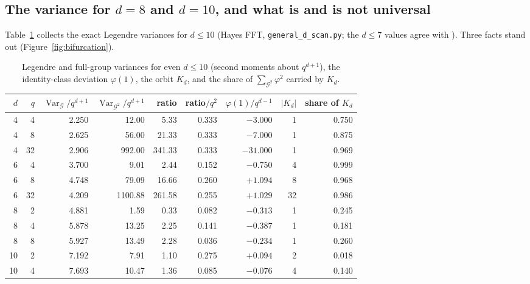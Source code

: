 \documentclass[11pt,a4paper]{amsart}
\theoremstyle{definition}
\newcommand{\G}{\mathcal{G}}
\newcommand{\Var}{\operatorname{Var}}
\begin{document}
\subsection{The variance for \texorpdfstring{$d=8$ and $d=10$}{d=8 and d=10}, and what is and is not universal}
Table~\ref{tab:generald} collects the exact Legendre variances for $d\le10$ (Hayes FFT, \texttt{general\_d\_scan.py}; the $d\le7$ values agree with \cite[Table~4]{Chen}). Three facts stand out (Figure~\ref{fig:bifurcation}).

\begin{table}[H]
\centering
\caption{Legendre and full-group variances for even $d\le10$ (second moments about $q^{d+1}$), the identity-class deviation $\varphi(1)$, the orbit $K_d$, and the share of $\sum_{\G^2}\varphi^2$ carried by $K_d$.}\label{tab:generald}
\small
\begin{tabular}{@{}rrrrrrrrr@{}}
\toprule
$d$ & $q$ & $\Var_\G/q^{d+1}$ & $\Var_{\G^2}/q^{d+1}$ & ratio & ratio$/q^2$ & $\varphi(1)/q^{d-1}$ & $|K_d|$ & share of $K_d$\\
\midrule
4 & 4 & 2.250 & 12.00 & 5.33 & 0.333 & $-3.000$ & 1 & 0.750\\
4 & 8 & 2.625 & 56.00 & 21.33 & 0.333 & $-7.000$ & 1 & 0.875\\
4 & 32 & 2.906 & 992.00 & 341.33 & 0.333 & $-31.000$ & 1 & 0.969\\
6 & 4 & 3.700 & 9.01 & 2.44 & 0.152 & $-0.750$ & 4 & 0.999\\
6 & 8 & 4.748 & 79.09 & 16.66 & 0.260 & $+1.094$ & 8 & 0.968\\
6 & 32 & 4.209 & 1100.88 & 261.58 & 0.255 & $+1.029$ & 32 & 0.986\\
8 & 2 & 4.881 & 1.59 & 0.33 & 0.082 & $-0.313$ & 1 & 0.245\\
8 & 4 & 5.878 & 13.25 & 2.25 & 0.141 & $-0.387$ & 1 & 0.181\\
8 & 8 & 5.927 & 13.49 & 2.28 & 0.036 & $-0.234$ & 1 & 0.260\\
10 & 2 & 7.192 & 7.91 & 1.10 & 0.275 & $+0.094$ & 2 & 0.018\\
10 & 4 & 7.693 & 10.47 & 1.36 & 0.085 & $-0.076$ & 4 & 0.140\\
\bottomrule
\end{tabular}
\end{table}
\end{document}
